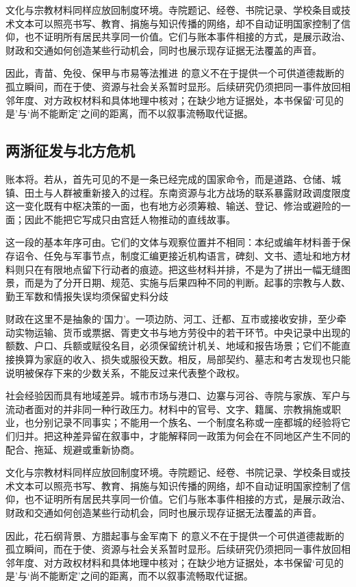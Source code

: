 文化与宗教材料同样应放回制度环境。寺院题记、经卷、书院记录、学校条目或技术文本可以照亮书写、教育、捐施与知识传播的网络，却不自动证明国家控制了信仰，也不证明所有居民共享同一价值。它们与账本事件相接的方式，是展示政治、财政和交通如何创造某些行动机会，同时也展示现存证据无法覆盖的声音。

因此，青苗、免役、保甲与市易等法推进 的意义不在于提供一个可供道德裁断的孤立瞬间，而在于使、资源与社会关系暂时显形。后续研究仍须把同一事件放回相邻年度、对方政权材料和具体地理中核对；在缺少地方证据处，本书保留‘可见的是’与‘尚不能断定’之间的距离，而不以叙事流畅取代证据。

\subsection{两浙征发与北方危机}

账本将。若从，首先可见的不是一条已经完成的国家命令，而是道路、仓储、城镇、田土与人群被重新接入的过程。东南资源与北方战场的联系暴露财政调度限度 这一变化既有中枢决策的一面，也有地方必须筹粮、输送、登记、修治或避险的一面；因此不能把它写成只由宫廷人物推动的直线故事。

这一段的基本年序可由。它们的文体与观察位置并不相同：本纪或编年材料善于保存诏令、任免与军事节点，制度汇编更接近机构语言，碑刻、文书、遗址和地方材料则只在有限地点留下行动者的痕迹。把这些材料并排，不是为了拼出一幅无缝图景，而是为了分开日期、规范、实施与后果四种不同的判断。起事的宗教与人数、勤王军数和情报失误均须保留史料分歧

财政在这里不是抽象的‘国力’。一项边防、河工、迁都、互市或接收安排，至少牵动实物运输、货币或票据、胥吏文书与地方劳役中的若干环节。中央记录中出现的额数、户口、兵额或赋役名目，必须保留统计机关、地域和报告场景；它们不能直接换算为家庭的收入、损失或服役天数。相反，局部契约、墓志和考古发现也只能说明被保存下来的少数关系，不能反过来代表整个政权。

社会经验因而具有地域差异。城市市场与港口、边寨与河谷、寺院与家族、军户与流动者面对的并非同一种行政压力。材料中的官号、文字、籍属、宗教捐施或职业，也分别记录不同事实；不能用一个族名、一个制度名称或一座都城的经验将它们归并。把这种差异留在叙事中，才能解释同一政策为何会在不同地区产生不同的配合、拖延、规避或重新协商。

文化与宗教材料同样应放回制度环境。寺院题记、经卷、书院记录、学校条目或技术文本可以照亮书写、教育、捐施与知识传播的网络，却不自动证明国家控制了信仰，也不证明所有居民共享同一价值。它们与账本事件相接的方式，是展示政治、财政和交通如何创造某些行动机会，同时也展示现存证据无法覆盖的声音。

因此，花石纲背景、方腊起事与金军南下 的意义不在于提供一个可供道德裁断的孤立瞬间，而在于使、资源与社会关系暂时显形。后续研究仍须把同一事件放回相邻年度、对方政权材料和具体地理中核对；在缺少地方证据处，本书保留‘可见的是’与‘尚不能断定’之间的距离，而不以叙事流畅取代证据。

